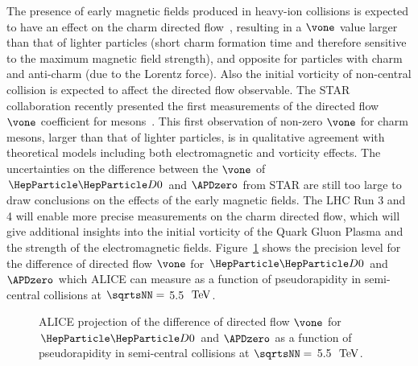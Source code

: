 The presence of early magnetic fields produced in heavy-ion collisions is expected to have an effect on the charm directed flow~\cite{Das:2016cwd,Chatterjee:2018lsx,Plumari,Sandeep}, resulting in a $\vone$ value larger than that of lighter particles (short charm formation time and therefore sensitive to the maximum magnetic field strength), and opposite for particles with charm and anti-charm (due to the Lorentz force). Also the initial vorticity of non-central collision is expected to affect the directed flow observable.
The STAR collaboration recently presented the first measurements of the directed flow $\vone$ coefficient for mesons~\cite{Singha}. This first observation of non-zero $\vone$ for charm mesons, larger than that of lighter particles, is in qualitative agreement with theoretical models including both electromagnetic and vorticity effects. The uncertainties on the difference between the $\vone$ of $\PDz$ and $\APDzero$
from STAR are still too large to draw conclusions on the effects of the early magnetic fields.
The LHC Run 3 and 4 will enable more precise measurements on the charm directed flow, which will give additional insights into the initial vorticity of the Quark Gluon Plasma and the strength of the electromagnetic fields. Figure~\ref{fig:v1} shows the precision level for the difference of directed flow $\vone$ for $\PDz$ and $\APDzero$ which ALICE can measure as a function of pseudorapidity in semi-central \PbPb collisions at $\sqrtsNN=$ 5.5 $~\text{TeV}$.

\begin{figure}
\centering
{}
\caption{ALICE projection of the difference of directed flow $\vone$ for $\PDz$ and $\APDzero$ as a function of pseudorapidity in semi-central \PbPb collisions at $\sqrtsNN=$ 5.5 $~\text{TeV}$.}
\label{fig:v1}
\end {figure}





